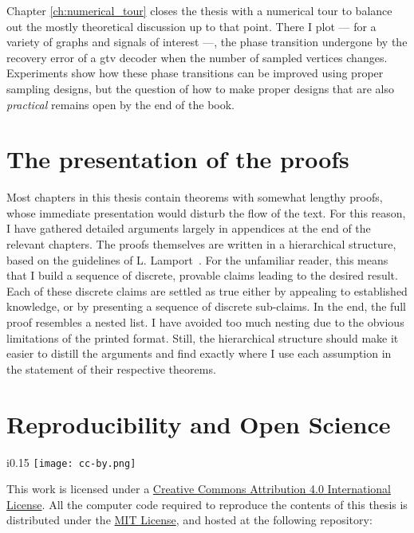 Chapter \ref{ch:numerical_tour} closes the thesis with a numerical tour to balance out the mostly theoretical discussion up to that point. There I plot --- for a variety of graphs and signals of interest ---, the phase transition undergone by the recovery error of a \acrshort{gtv} decoder when the number of sampled vertices changes. Experiments show how these phase transitions can be improved using proper sampling designs, but the question of how to make proper designs that  are also \emph{practical} remains open by the end of the book.

\section{The presentation of the proofs}

Most chapters in this thesis contain theorems with somewhat lengthy proofs, whose immediate presentation would disturb the flow of the text. For this reason, I have gathered detailed arguments largely in appendices at the end of the relevant chapters. The proofs themselves are written in a hierarchical structure, based on the guidelines of L. Lamport~\cite{lamport2012}. For the unfamiliar reader, this means that I build a sequence of discrete, provable claims leading to the desired result. Each of these discrete claims are settled as true either by appealing to established knowledge, or by presenting a sequence of discrete sub-claims. In the end, the full proof resembles a nested list. I have avoided too much nesting due to the obvious limitations of the printed format. Still, the hierarchical structure should make it easier to distill the arguments and find exactly where I use each assumption in the statement of their respective theorems.

\section{Reproducibility and Open Science}

\begin{minipage}{\textwidth}
    {%
    \setlength\intextsep{0pt}
        \begin{wrapfigure}{i}{0.15\textwidth}
            \texttt{[image: cc-by.png]}
        \end{wrapfigure}
    \noindent This work is licensed under a \href{http://creativecommons.org/licenses/by/4.0/}{Creative Commons Attribution 4.0 International License}. All the computer code required to reproduce the contents of this thesis is distributed under the \href{https://opensource.org/licenses/MIT}{MIT License}, and hosted at the following repository:
    \begin{center}
    \end{center}%
    }
\end{minipage}
